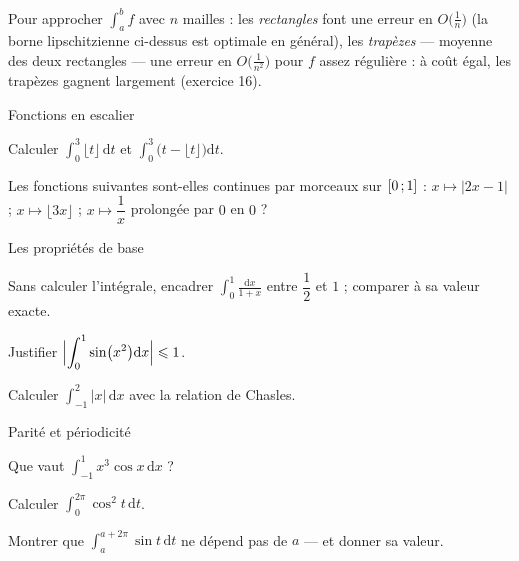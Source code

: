 \begin{savoirfaire}
Pour approcher $\int_a^b f$ avec $n$ mailles : les \emph{rectangles} font
une erreur en $O\bigl(\frac1n\bigr)$ (la borne lipschitzienne ci-dessus
est optimale en général), les \emph{trapèzes} — moyenne des deux rectangles
— une erreur en $O\bigl(\frac{1}{n^{2}}\bigr)$ pour $f$ assez régulière :
à coût égal, les trapèzes gagnent largement (exercice 16).
\end{savoirfaire}

\exercices
{}

\begin{exercice}[1]{Fonctions en escalier}
\begin{questions}
  \item Calculer $\displaystyle\int_{0}^{3}\lfloor t\rfloor\,\mathrm{d}t$
    et $\displaystyle\int_{0}^{3}\bigl(t-\lfloor t\rfloor\bigr)\mathrm{d}t$.
  \item Les fonctions suivantes sont-elles continues par morceaux sur
    $\mathopen{[}0\,{;}\,1\mathclose{]}$ : $x\mapsto|2x-1|$ ; $x\mapsto\lfloor3x\rfloor$ ;
    $x\mapsto\dfrac1x$ prolongée par $0$ en $0$ ?
\end{questions}
\end{exercice}

\begin{exercice}[1]{Les propriétés de base}
\begin{questions}
  \item Sans calculer l'intégrale, encadrer
    $\displaystyle\int_{0}^{1}\frac{\mathrm{d}x}{1+x}$ entre $\dfrac12$ et
    $1$ ; comparer à sa valeur exacte.
  \item Justifier
    $\Bigl|\displaystyle\int_{0}^{1}\sin\bigl(x^{2}\bigr)\mathrm{d}x\Bigr|\leqslant1$.
  \item Calculer $\displaystyle\int_{-1}^{2}|x|\,\mathrm{d}x$ avec la
    relation de Chasles.
\end{questions}
\end{exercice}

\begin{exercice}[1]{Parité et périodicité}
\begin{questions}
  \item Que vaut $\displaystyle\int_{-1}^{1}x^{3}\cos x\,\mathrm{d}x$ ?
  \item Calculer $\displaystyle\int_{0}^{2\pi}\cos^{2}t\,\mathrm{d}t$.
  \item Montrer que $\displaystyle\int_{a}^{a+2\pi}\sin t\,\mathrm{d}t$ ne
    dépend pas de $a$ — et donner sa valeur.
\end{questions}
\end{exercice}

